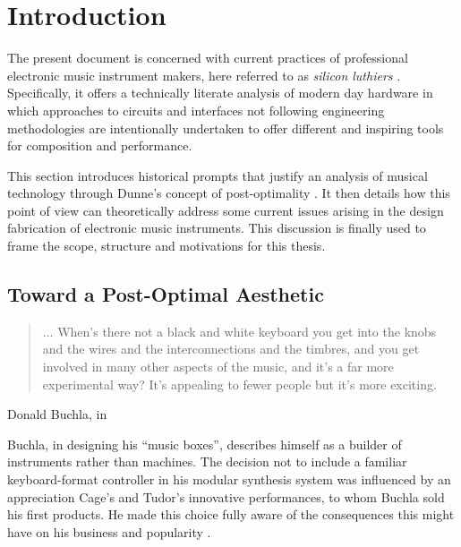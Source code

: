 \chapter{Introduction}\label{introduction}
The present document is concerned with current practices of professional electronic music instrument makers, here referred to as \textit{silicon luthiers} \citep{collins2008}. Specifically, it offers a technically literate analysis of modern day hardware in which approaches to circuits and interfaces not following engineering methodologies are intentionally undertaken to offer different and inspiring tools for composition and performance.   

This section introduces historical prompts that justify an analysis of musical technology  through Dunne's concept of post-optimality \citep{dunne2005}. It then details how this point of view can theoretically address some current issues arising in the design fabrication of electronic music instruments. This discussion is finally used to frame the scope, structure and motivations for this thesis. 

\newpage

\section{Toward a Post-Optimal Aesthetic} 

\begin{quote}
	... When's there not a black and white keyboard you get into the knobs and the wires and the interconnections and the timbres, and you get involved in many other aspects of the music, and it’s a far more experimental way? It’s appealing to fewer people but it’s more exciting.
\end{quote}

Donald Buchla, in \citep{pinch2001}

Buchla, in designing his ``music boxes'', describes himself as a builder of instruments rather than machines. The decision not to include a familiar keyboard-format controller in his modular synthesis system was influenced by an appreciation Cage's and Tudor's innovative performances, to whom Buchla sold his first products. He made this choice fully aware of the consequences this might have on his business and popularity \citep[p.44]{pinch2001}. 

